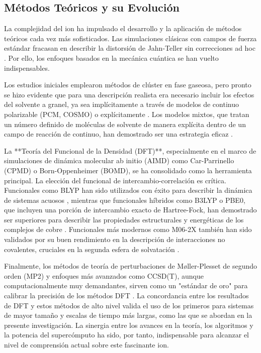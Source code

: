 \subsection{Métodos Teóricos y su Evolución}

La complejidad del ion  ha impulsado el desarrollo y la aplicación de métodos teóricos cada vez más sofisticados. Las simulaciones clásicas con campos de fuerza estándar fracasan en describir la distorsión de Jahn-Teller sin correcciones ad hoc \cite{Wa-2008-01}. Por ello, los enfoques basados en la mecánica cuántica se han vuelto indispensables.

Los estudios iniciales emplearon métodos de clúster en fase gaseosa, pero pronto se hizo evidente que para una descripción realista era necesario incluir los efectos del solvente a granel, ya sea implícitamente a través de modelos de continuo polarizable (PCM, COSMO) o explícitamente \cite{Wa-2008-01, Wa-2024-01}. Los modelos mixtos, que tratan un número definido de moléculas de solvente de manera explícita dentro de un campo de reacción de continuo, han demostrado ser una estrategia eficaz \cite{Wa-2009-01}.

La **Teoría del Funcional de la Densidad (DFT)**, especialmente en el marco de simulaciones de dinámica molecular ab initio (AIMD) como Car-Parrinello (CPMD) o Born-Oppenheimer (BOMD), se ha consolidado como la herramienta principal. La elección del funcional de intercambio-correlación es crítica. Funcionales como BLYP han sido utilizados con éxito para describir la dinámica de sistemas acuosos \cite{Wa-2004-02, Wa-2005-02}, mientras que funcionales híbridos como B3LYP o PBE0, que incluyen una porción de intercambio exacto de Hartree-Fock, han demostrado ser superiores para describir las propiedades estructurales y energéticas de los complejos de cobre \cite{Wa-2003-01, Wa-2009-01, Wa-2010-02}. Funcionales más modernos como M06-2X también han sido validados por su buen rendimiento en la descripción de interacciones no covalentes, cruciales en la segunda esfera de solvatación \cite{Me-2022-02, Me-2023-01}.

Finalmente, los métodos de teoría de perturbaciones de Møller-Plesset de segundo orden (MP2) y enfoques más avanzados como CCSD(T), aunque computacionalmente muy demandantes, sirven como un "estándar de oro" para calibrar la precisión de los métodos DFT \cite{Wa-2017-01}. La concordancia entre los resultados de DFT y estos métodos de alto nivel valida el uso de los primeros para sistemas de mayor tamaño y escalas de tiempo más largas, como las que se abordan en la presente investigación. La sinergia entre los avances en la teoría, los algoritmos y la potencia del supercómputo ha sido, por tanto, indispensable para alcanzar el nivel de comprensión actual sobre este fascinante ion.
